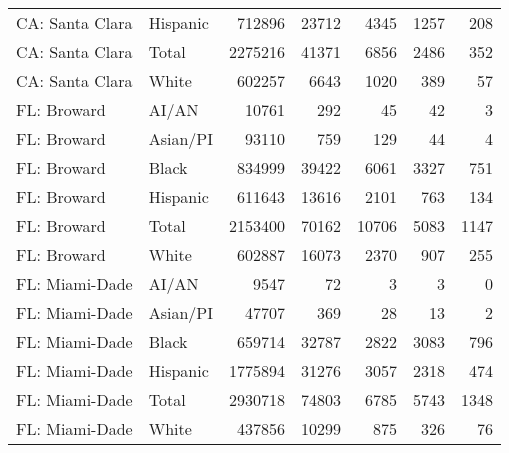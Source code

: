 \documentclass[9pt,twoside,lineno]{pnas-new}
\begin{document}
\begin{table}[ht]
\begin{tabular}{llrrrrr}
  CA: Santa Clara & Hispanic & 712896 & 23712 & 4345 & 1257 & 208 \\ 
  CA: Santa Clara & Total & 2275216 & 41371 & 6856 & 2486 & 352 \\ 
  CA: Santa Clara & White & 602257 & 6643 & 1020 & 389 & 57 \\ 
  FL: Broward & AI/AN & 10761 & 292 & 45 & 42 & 3 \\ 
  FL: Broward & Asian/PI & 93110 & 759 & 129 & 44 & 4 \\ 
  FL: Broward & Black & 834999 & 39422 & 6061 & 3327 & 751 \\ 
  FL: Broward & Hispanic & 611643 & 13616 & 2101 & 763 & 134 \\ 
  FL: Broward & Total & 2153400 & 70162 & 10706 & 5083 & 1147 \\ 
  FL: Broward & White & 602887 & 16073 & 2370 & 907 & 255 \\ 
  FL: Miami-Dade & AI/AN & 9547 & 72 & 3 & 3 & 0 \\ 
  FL: Miami-Dade & Asian/PI & 47707 & 369 & 28 & 13 & 2 \\ 
  FL: Miami-Dade & Black & 659714 & 32787 & 2822 & 3083 & 796 \\ 
  FL: Miami-Dade & Hispanic & 1775894 & 31276 & 3057 & 2318 & 474 \\ 
  FL: Miami-Dade & Total & 2930718 & 74803 & 6785 & 5743 & 1348 \\ 
  FL: Miami-Dade & White & 437856 & 10299 & 875 & 326 & 76 \\ 
\end{tabular}
\end{table}
\end{document}
